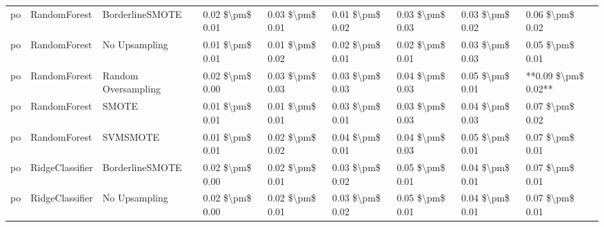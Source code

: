 \begin{tabular}{lllllllll}
      po &                    RandomForest &               BorderlineSMOTE & 0.02 \$\textbackslash pm\$ 0.01 &           0.03 \$\textbackslash pm\$ 0.01 &       0.01 \$\textbackslash pm\$ 0.02 &        0.03 \$\textbackslash pm\$ 0.03 &                         0.03 \$\textbackslash pm\$ 0.02 &     0.06 \$\textbackslash pm\$ 0.02 \\
      po &                    RandomForest &                 No Upsampling & 0.01 \$\textbackslash pm\$ 0.01 &           0.01 \$\textbackslash pm\$ 0.02 &       0.02 \$\textbackslash pm\$ 0.01 &        0.02 \$\textbackslash pm\$ 0.01 &                         0.03 \$\textbackslash pm\$ 0.03 &     0.05 \$\textbackslash pm\$ 0.01 \\
      po &                    RandomForest &           Random Oversampling & 0.02 \$\textbackslash pm\$ 0.00 &           0.03 \$\textbackslash pm\$ 0.03 &       0.03 \$\textbackslash pm\$ 0.03 &        0.04 \$\textbackslash pm\$ 0.03 &                         0.05 \$\textbackslash pm\$ 0.01 & **0.09 \$\textbackslash pm\$ 0.02** \\
      po &                    RandomForest &                         SMOTE & 0.01 \$\textbackslash pm\$ 0.01 &           0.01 \$\textbackslash pm\$ 0.01 &       0.03 \$\textbackslash pm\$ 0.01 &        0.03 \$\textbackslash pm\$ 0.03 &                         0.04 \$\textbackslash pm\$ 0.03 &     0.07 \$\textbackslash pm\$ 0.02 \\
      po &                    RandomForest &                      SVMSMOTE & 0.01 \$\textbackslash pm\$ 0.01 &           0.02 \$\textbackslash pm\$ 0.02 &       0.04 \$\textbackslash pm\$ 0.01 &        0.04 \$\textbackslash pm\$ 0.03 &                         0.05 \$\textbackslash pm\$ 0.01 &     0.07 \$\textbackslash pm\$ 0.01 \\
      po &                 RidgeClassifier &               BorderlineSMOTE & 0.02 \$\textbackslash pm\$ 0.00 &           0.02 \$\textbackslash pm\$ 0.01 &       0.03 \$\textbackslash pm\$ 0.02 &        0.05 \$\textbackslash pm\$ 0.01 &                         0.04 \$\textbackslash pm\$ 0.01 &     0.07 \$\textbackslash pm\$ 0.01 \\
      po &                 RidgeClassifier &                 No Upsampling & 0.02 \$\textbackslash pm\$ 0.00 &           0.02 \$\textbackslash pm\$ 0.01 &       0.03 \$\textbackslash pm\$ 0.02 &        0.05 \$\textbackslash pm\$ 0.01 &                         0.04 \$\textbackslash pm\$ 0.01 &     0.07 \$\textbackslash pm\$ 0.01 \\

\end{tabular}

